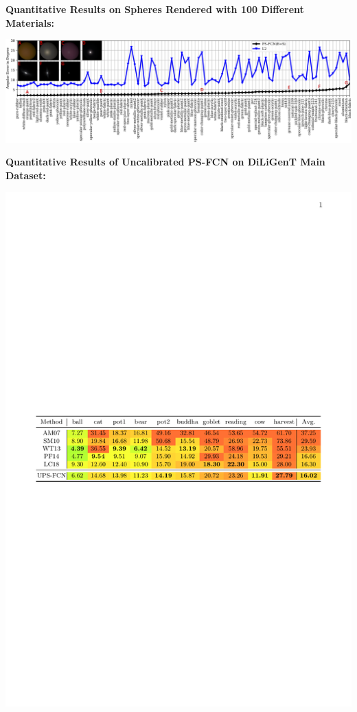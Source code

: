 \documentclass[a0paper,landscape]{baposter}
\begin{document}
\begin{poster}
{        \begin{minipage}[t]{0.6\textwidth}
            \textbf{\color{blue}Quantitative Results on Spheres Rendered with 100 Different Materials:} 
            \vspace{-0.5em}
            \begin{center}
                \includegraphics[width=\textwidth]{images/100brdf.png}
            \end{center}
        \end{minipage}
        \begin{minipage}[t]{0.4\textwidth}
            \textbf{\color{blue}Quantitative Results of Uncalibrated PS-FCN on DiLiGenT Main Dataset:} 
            \vspace{-0.5em}
            \begin{center}
                \includegraphics[width=\textwidth]{images/res_uncalibrated}
            \end{center}
            \vspace{-1.5em}


\end{minipage}}
\end{poster}
\end{document}
